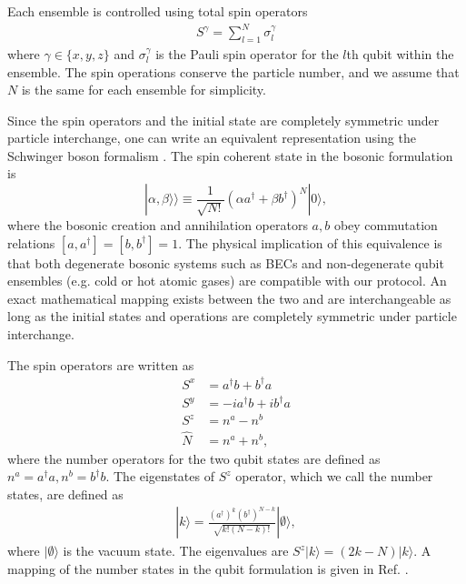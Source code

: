 \documentclass{WileyMSP-template}
\begin{document}
Each ensemble is controlled using total spin operators
%
\begin{align}
S^\gamma = \sum_{l=1}^N \sigma_l^\gamma
\end{align}
%
where $\gamma \in\{ x, y, z \} $ and $ \sigma_l^\gamma $ is the Pauli spin operator for the $ l $th qubit within the ensemble.  The spin operations conserve the particle number, and we assume that $ N $ is the same for each ensemble for simplicity.

Since the spin operators and the initial state are completely symmetric under particle interchange, one can write an equivalent representation using the Schwinger boson formalism \cite{byrnes2020quantum}.  The spin coherent state in the bosonic formulation is
%
\begin{equation}
\label{becqubit}
|\alpha,\beta\rangle\rangle\equiv\frac{1}{\sqrt{N!}}(\alpha a^\dagger+\beta b^\dagger)^{N}|0\rangle,
\end{equation}
%
where the bosonic creation and annihilation operators $ a, b $ obey commutation relations $[a,a^\dagger]=[b,b^\dagger]=1$. The physical implication of this equivalence is that both degenerate bosonic systems such as BECs and non-degenerate qubit ensembles (e.g. cold or hot atomic gases) are compatible with our protocol.  An exact mathematical mapping exists between the two \cite{byrnes2023multipartite} and are interchangeable as long as the initial states and operations are completely symmetric under particle interchange. 

The spin operators are written as
%
\begin{align}
S^x & = a^\dagger b + b^\dagger a \nonumber \\
S^y & = -i a^\dagger b + i b^\dagger a \nonumber \\
S^z & = n^a - n^b \nonumber \\
\hat{N} & = n^a + n^b ,
\end{align}
%
where the number operators for the two qubit states are defined as $ n^a = a^\dagger a, n^b = b^\dagger b $.  The eigenstates of $ S^z $ operator, which we call the number states, are defined as
%
\begin{align}
| k \rangle = \frac{ (a^\dagger)^k (b^\dagger)^{N-k} }{\sqrt{k! (N-k)!}} | \emptyset \rangle ,
\end{align}
%
where $ | \emptyset \rangle $ is the vacuum state.  The eigenvalues are $ S^z |k \rangle = (2k - N) | k \rangle $. A mapping of the number states in the qubit formulation is given in Ref. \cite{byrnes2023multipartite}.
\end{document}
